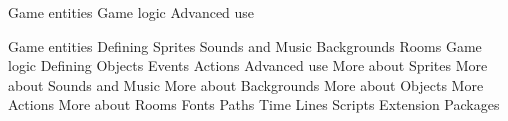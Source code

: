 Game entities
Game logic
Advanced use


Game entities
  Defining Sprites
  Sounds and Music
  Backgrounds
  Rooms
Game logic
  Defining Objects
  Events
  Actions
Advanced use
  More about Sprites
  More about Sounds and Music
  More about Backgrounds
  More about Objects
  More Actions
  More about Rooms
  Fonts
  Paths
  Time Lines
  Scripts
  Extension Packages
  